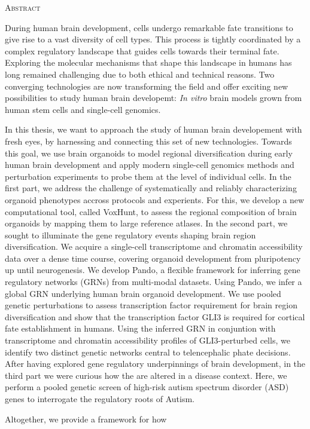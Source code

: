 \begin{center}
    \large\textsc{Abstract}
\end{center}

During human brain development, cells undergo remarkable fate transitions to give rise to a vast diversity of cell types. This process is tightly coordinated by a complex regulatory landscape that guides cells towards their terminal fate. Exploring the molecular mechanisms that shape this landscape in humans has long remained challenging due to both ethical and technical reasons. Two converging technologies are now transforming the field and offer exciting new possibilities to study human brain developemt: \textit{In vitro} brain models grown from human stem cells and single-cell genomics. 

In this thesis, we want to approach the study of human brain developement with fresh eyes, by harnessing and connecting this set of new technologies. Towards this goal, we use brain organoids to model regional diversification during early human brain development and apply modern single-cell genomics methods and perturbation experiments to probe them at the level of individual cells. In the first part, we address the challenge of systematically and reliably characterizing organoid phenotypes accross protocols and experients. For this, we develop a new computational tool, called VoxHunt, to assess the regional composition of brain organoids by mapping them to large reference atlases. In the second part, we sought to illuminate the gene regulatory events shaping brain region diversification. We acquire a single-cell transcriptome and chromatin accessibility data over a dense time course, covering organoid development from pluripotency up until neurogenesis. We develop Pando, a flexible framework for inferring gene regulatory networks (GRNs) from multi-modal datasets. Using Pando, we infer a global GRN underlying human brain organoid development. We use pooled genetic perturbations to assess transcription factor requirement for brain region diversification and show that the transcription factor GLI3 is required for cortical fate establishment in humans. Using the inferred GRN in conjuntion with transcriptome and chromatin accessibility profiles of GLI3-perturbed cells, we identify two distinct genetic networks central to telencephalic phate decisions. After having explored gene regulatory underpinnings of brain development, in the third part we were curious how the are altered in a disease context. Here, we perform a pooled genetic screen of high-risk autism spectrum disorder (ASD) genes to interrogate the regulatory roots of Autism. 

Altogether, we provide a framework for how 


